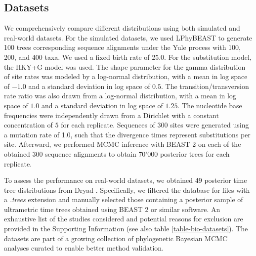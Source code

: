 \documentclass[10pt,letterpaper]{article}
\begin{document}
\subsection*{Datasets}

We comprehensively compare different distributions using both simulated and real-world datasets. For the simulated datasets, we used LPhyBEAST \cite{linguaphylo} to generate 100 trees corresponding sequence alignments under the Yule process \cite{yule} with 100, 200, and 400 taxa. We used a fixed birth rate of 25.0. For the substitution
model, the HKY+G model \cite{hky} was used. The shape parameter for the gamma
distribution of site rates was modeled by a log-normal distribution, with a
mean in log space of $-1.0$ and a standard deviation in log space of $0.5$. The transition/transversion rate ratio was also drawn from a log-normal distribution, with
a mean in log space of $1.0$ and a standard deviation in log space of $1.25$. The nucleotide base frequencies were independently drawn from a Dirichlet with a constant concentration of $5$ for each replicate. Sequences of 300 sites were generated using a mutation rate of 1.0, such that the divergence times represent substitutions per site. Afterward, we performed MCMC inference with BEAST 2 \cite{beast2} on each of the obtained 300 sequence alignments to obtain 70'000 posterior trees for each replicate.

To assess the performance on real-world datasets, we obtained 49 posterior time tree distributions from Dryad \cite{dryad}. Specifically, we filtered the database for files with a \emph{.trees} extension and manually selected those containing a posterior sample of ultrametric time trees obtained using BEAST 2 or similar software. An exhaustive list of the studies considered and potential reasons for exclusion are provided in the Supporting Information (see also table \ref{table-bio-datasets}). The datasets are part of a growing collection of phylogenetic Bayesian MCMC analyses \cite{tree_dataset} curated to enable better method validation.
\end{document}
